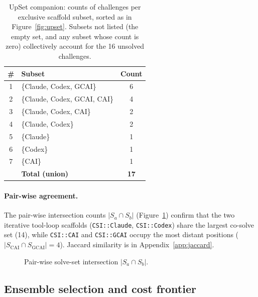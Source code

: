 \begin{table}[t]
\centering
\footnotesize
\setlength{\tabcolsep}{4pt}
\renewcommand{\arraystretch}{1.05}
\begin{tabular*}{\columnwidth}{@{\extracolsep{\fill}}clc@{}}
\toprule
\# & Subset & Count \\
\midrule
1  & \{Claude, Codex, GCAI\}      & 6 \\
2  & \{Claude, Codex, GCAI, CAI\} & 4 \\
3  & \{Claude, Codex, CAI\}       & 2 \\
4  & \{Claude, Codex\}            & 2 \\
5  & \{Claude\}                   & 1 \\
6  & \{Codex\}                    & 1 \\
7  & \{CAI\}                      & 1 \\
\midrule
   & \textbf{Total (union)}   & \textbf{17} \\
\bottomrule
\end{tabular*}
\caption{UpSet companion: counts of challenges per exclusive scaffold subset, sorted as in Figure~\ref{fig:upset}. Subsets not listed (the empty set, and any subset whose count is zero) collectively account for the 16 unsolved challenges.}
\label{tab:upset}
\end{table}

\paragraph{Pair-wise agreement.}\label{sec:pairwise}

The pair-wise intersection counts $|S_a \cap S_b|$ (Figure~\ref{fig:pairwise}) confirm that the two iterative tool-loop scaffolds (\texttt{CSI::Claude}, \texttt{CSI::Codex}) share the largest co-solve set (14), while \texttt{CSI::CAI} and \texttt{CSI::GCAI} occupy the most distant positions ($|S_{\text{CAI}} \cap S_{\text{GCAI}}| = 4$). Jaccard similarity is in Appendix~\ref{app:jaccard}.

\begin{figure}[t]
\centering
\resizebox{\columnwidth}{!}{}
\caption{Pair-wise solve-set intersection $|S_a \cap S_b|$.}
\label{fig:pairwise}
\end{figure}

\subsection{Ensemble selection and cost frontier}\label{sec:ensemble}

